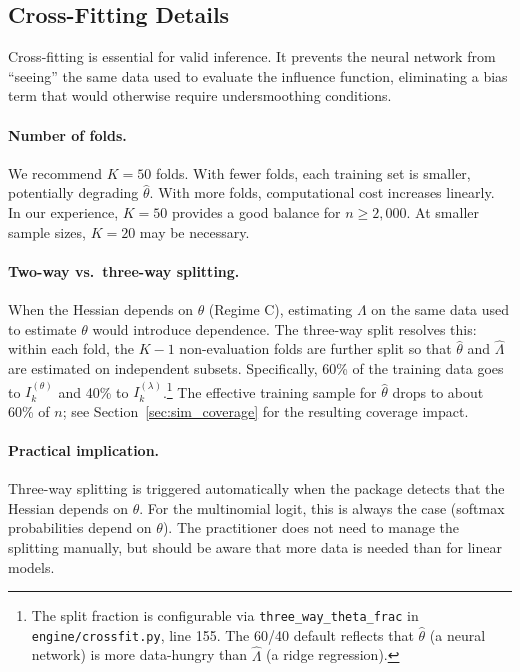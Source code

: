 \subsection{Cross-Fitting Details}

Cross-fitting is essential for valid inference. It prevents the neural network from ``seeing'' the same data used to evaluate the influence function, eliminating a bias term that would otherwise require undersmoothing conditions.

\paragraph{Number of folds.} We recommend $K = 50$ folds. With fewer folds, each training set is smaller, potentially degrading $\hat{\theta}$. With more folds, computational cost increases linearly. In our experience, $K = 50$ provides a good balance for $n \geq 2{,}000$. At smaller sample sizes, $K = 20$ may be necessary.

\paragraph{Two-way vs.\ three-way splitting.} When the Hessian depends on $\theta$ (Regime C), estimating $\Lambda$ on the same data used to estimate $\theta$ would introduce dependence. The three-way split resolves this: within each fold, the $K-1$ non-evaluation folds are further split so that $\hat{\theta}$ and $\hat{\Lambda}$ are estimated on independent subsets. Specifically, 60\% of the training data goes to $I_k^{(\theta)}$ and 40\% to $I_k^{(\lambda)}$.\footnote{The split fraction is configurable via \texttt{three\_way\_theta\_frac} in \texttt{engine/crossfit.py}, line 155. The 60/40 default reflects that $\hat{\theta}$ (a neural network) is more data-hungry than $\hat{\Lambda}$ (a ridge regression).} The effective training sample for $\hat{\theta}$ drops to about 60\% of $n$; see Section~\ref{sec:sim_coverage} for the resulting coverage impact.

\paragraph{Practical implication.} Three-way splitting is triggered automatically when the package detects that the Hessian depends on $\theta$. For the multinomial logit, this is always the case (softmax probabilities depend on $\theta$). The practitioner does not need to manage the splitting manually, but should be aware that more data is needed than for linear models.

